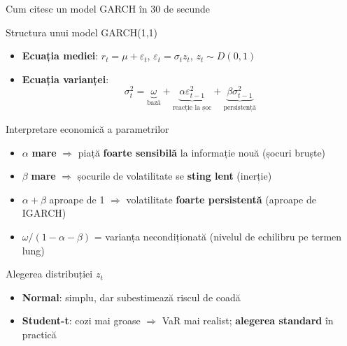 \documentclass[9pt, aspectratio=169, t]{beamer}
\begin{document}
\begin{frame}{Cum citesc un model GARCH în 30 de secunde}
    \small
        \vspace{-0.2cm}
        \begin{block}{Structura unui model GARCH(1,1)}
            \begin{itemize}
                \item \textbf{Ecuația mediei}: $r_t = \mu + \varepsilon_t$, \quad $\varepsilon_t = \sigma_t z_t$, \quad $z_t \sim D(0,1)$
                \item \textbf{Ecuația varianței}:
                    \vspace{-2mm}
                    \[ \sigma_t^2 = \underbrace{\omega}_{\text{bază}} + \underbrace{\alpha \varepsilon_{t-1}^2}_{\text{reacție la șoc}} + \underbrace{\beta \sigma_{t-1}^2}_{\text{persistență}} \]
                    \vspace{-2mm}
            \end{itemize}
        \end{block}
        \vspace{-1.5mm}
        \begin{exampleblock}{Interpretare economică a parametrilor}
            \begin{itemize}
                \item $\alpha$ \textbf{mare} $\Rightarrow$ piață \textbf{foarte sensibilă} la informație nouă (șocuri bruște)
                \item $\beta$ \textbf{mare} $\Rightarrow$ șocurile de volatilitate se \textbf{sting lent} (inerție)
                \item $\alpha + \beta$ aproape de 1 $\Rightarrow$ volatilitate \textbf{foarte persistentă} (aproape de IGARCH)
                \item $\omega / (1 - \alpha - \beta)$ = varianța necondiționată (nivelul de echilibru pe termen lung)
            \end{itemize}
        \end{exampleblock}
        \vspace{-1.5mm}
        \begin{alertblock}{Alegerea distribuției $z_t$}
            \begin{itemize}
                \item \textbf{Normal}: simplu, dar subestimează riscul de coadă
                \item \textbf{Student-t}: cozi mai groase $\Rightarrow$ VaR mai realist; \textbf{alegerea standard} în practică
            \end{itemize}
        \end{alertblock}
\end{frame}
\end{document}
